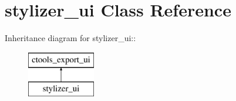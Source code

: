 \hypertarget{classstylizer__ui}{
\section{stylizer\_\-ui Class Reference}
\label{classstylizer__ui}
}
Inheritance diagram for stylizer\_\-ui::\begin{figure}[H]
\begin{center}
\leavevmode
\includegraphics[height=2cm]{classstylizer__ui}
\end{center}
\end{figure}
